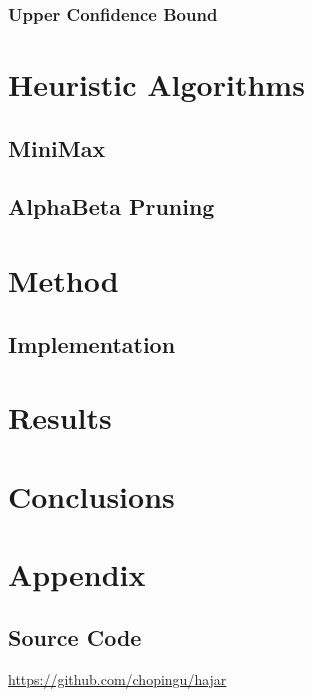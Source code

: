 \documentclass[titlepage]{article}
\begin{document}
\subsubsection{Upper Confidence Bound}

\newpage

\section{Heuristic Algorithms}
\subsection{MiniMax}
\subsection{AlphaBeta Pruning}

\newpage

\section{Method}

\subsection{Implementation}

\newpage

\section{Results}

\newpage

\section{Conclusions}

\newpage

\appendix

\section{Appendix}
\subsection{Source Code}

\centerline{\href{https://github.com/chopingu/hajar}{https://github.com/chopingu/hajar}}

\newpage



\end{document}
